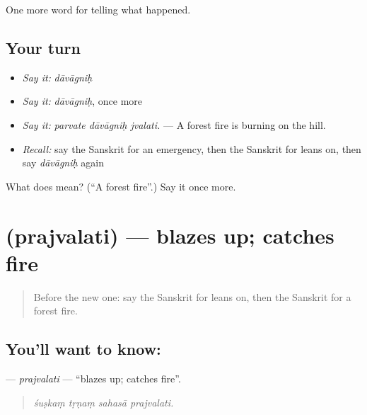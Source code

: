 \begin{grammarlens}[title={What you've built}]
One more word for telling what happened.
\end{grammarlens}

\subsection*{Your turn}
\begin{itemize}
\raggedright
  \item \emph{Say it:} \emph{dāvāgniḥ}
  \item \emph{Say it:} \emph{dāvāgniḥ}, once more
  \item \emph{Say it:} \emph{parvate dāvāgniḥ jvalati.} — A forest fire is burning on the hill.
  \item \emph{Recall:} say the Sanskrit for an emergency, then the Sanskrit for leans on, then say \emph{dāvāgniḥ} again
\end{itemize}

\begin{tcolorbox}[breakable,colback=teal!4,colframe=teal!35!black,title={Before you move on}]
What does  mean? (\textquotedblleft{}A forest fire\textquotedblright{}.) Say it once more.
\end{tcolorbox}
\section[\texorpdfstring{\sk{प्रज्वलति} (prajvalati)}{प्रज्वलति (prajvalati)}]{ (prajvalati) — blazes up; catches fire}

\label{lesson:SA-C296-prajvalati}



\begin{quote}
Before the new one: say the Sanskrit for leans on, then the Sanskrit for a forest fire.
\end{quote}

\subsection*{You'll want to know: }
\textbf{} — \emph{prajvalati} — \textquotedblleft{}blazes up; catches fire\textquotedblright{}.

\begin{quote}
   
\end{quote}

\begin{quote}
\emph{śuṣkaṃ tṛṇaṃ sahasā prajvalati.}
\end{quote}

